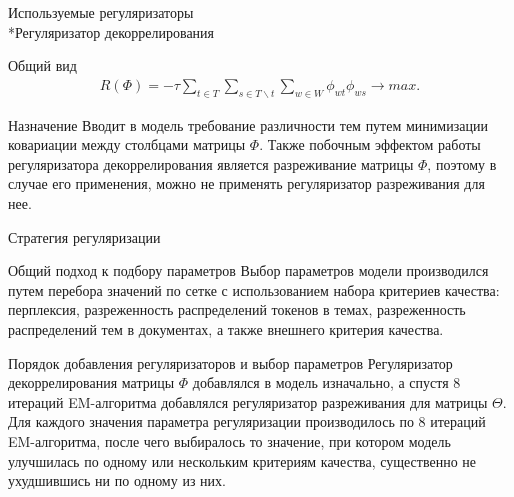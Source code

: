 \documentclass{beamer}
\begin{document}
\begin{frame}{Используемые регуляризаторы \\*Регуляризатор декоррелирования}
\begin{block}{Общий вид}
\begin{align*}
R(\Phi)=-\tau \sum_{t \in T}\sum_{s \in T\backslash t}\sum_{w \in W} \phi_{wt}\phi_{ws} \to max.
\end{align*} 
    \end{block}
\begin{block}{Назначение}
Вводит в модель требование различности тем путем минимизации ковариации между столбцами матрицы $\Phi$. Также побочным эффектом работы регуляризатора декоррелирования является разреживание матрицы $\Phi$, поэтому в случае его применения, можно не применять регуляризатор разреживания для нее.
    \end{block}
\end{frame}
\begin{frame}{Стратегия регуляризации}
\begin{block}{Общий подход к подбору параметров}
Выбор параметров модели производился путем перебора значений по сетке с использованием набора критериев качества: перплексия, разреженность распределений токенов в темах, разреженность распределений тем в документах, а также внешнего критерия качества. 
    \end{block}
\begin{block}{Порядок добавления регуляризаторов и выбор параметров}
Регуляризатор декоррелирования матрицы $\Phi$ добавлялся в модель изначально, а спустя 8 итераций EM-алгоритма добавлялся регуляризатор разреживания для матрицы $\Theta$. 
Для каждого значения параметра регуляризации производилось по 8 итераций EM-алгоритма, после чего выбиралось то значение, при котором модель улучшилась по одному или нескольким критериям качества, существенно не ухудшившись ни по одному из них.
    \end{block}
\end{frame}
\end{document}
